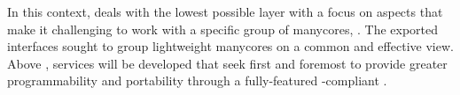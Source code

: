 	In this context, \nanvix \hal deals with the lowest possible layer
	with a focus on aspects that make it challenging to work with a
	specific group of manycores, \ie \lightweight \manycores. The exported
	interfaces sought to group lightweight manycores on a common and effective
	view. Above \hal, services will be developed that seek first and foremost
	to provide greater programmability and portability through a fully-featured
	\posix-compliant \os.

